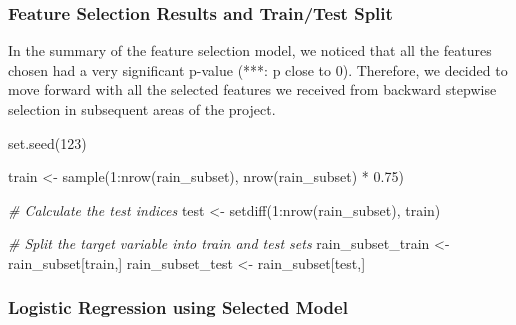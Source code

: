 \documentclass[
]{article}
\newenvironment{Shaded}{\begin{snugshade}}{\end{snugshade}}
\newcommand{\AttributeTok}[1]{\textcolor[rgb]{0.77,0.63,0.00}{#1}}
\newcommand{\CommentTok}[1]{\textcolor[rgb]{0.56,0.35,0.01}{\textit{#1}}}
\newcommand{\DecValTok}[1]{\textcolor[rgb]{0.00,0.00,0.81}{#1}}
\newcommand{\FloatTok}[1]{\textcolor[rgb]{0.00,0.00,0.81}{#1}}
\newcommand{\FunctionTok}[1]{\textcolor[rgb]{0.00,0.00,0.00}{#1}}
\newcommand{\NormalTok}[1]{#1}
\newcommand{\OtherTok}[1]{\textcolor[rgb]{0.56,0.35,0.01}{#1}}
\newcommand{\SpecialCharTok}[1]{\textcolor[rgb]{0.00,0.00,0.00}{#1}}
\begin{document}
\hypertarget{feature-selection-results-and-traintest-split}{%
\subsubsection{Feature Selection Results and Train/Test
Split}\label{feature-selection-results-and-traintest-split}}

In the summary of the feature selection model, we noticed that all the
features chosen had a very significant p-value (***: p close to 0).
Therefore, we decided to move forward with all the selected features we
received from backward stepwise selection in subsequent areas of the
project.

\begin{Shaded}
\begin{Highlighting}[]
\FunctionTok{set.seed}\NormalTok{(}\DecValTok{123}\NormalTok{)}

\NormalTok{train }\OtherTok{\textless{}{-}} \FunctionTok{sample}\NormalTok{(}\DecValTok{1}\SpecialCharTok{:}\FunctionTok{nrow}\NormalTok{(rain\_subset), }\FunctionTok{nrow}\NormalTok{(rain\_subset) }\SpecialCharTok{*} \FloatTok{0.75}\NormalTok{)}

\CommentTok{\# Calculate the test indices}
\NormalTok{test }\OtherTok{\textless{}{-}} \FunctionTok{setdiff}\NormalTok{(}\DecValTok{1}\SpecialCharTok{:}\FunctionTok{nrow}\NormalTok{(rain\_subset), train)}

\CommentTok{\# Split the target variable into train and test sets}
\NormalTok{rain\_subset\_train }\OtherTok{\textless{}{-}}\NormalTok{ rain\_subset[train,]}
\NormalTok{rain\_subset\_test }\OtherTok{\textless{}{-}}\NormalTok{ rain\_subset[test,]}
\end{Highlighting}
\end{Shaded}

\hypertarget{logistic-regression-using-selected-model}{%
\subsubsection{Logistic Regression using Selected
Model}\label{logistic-regression-using-selected-model}}

\begin{Shaded}
\end{Shaded}
\end{document}
